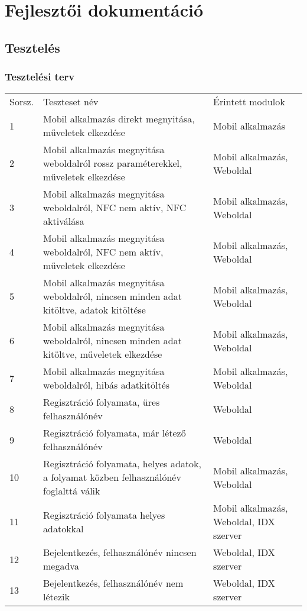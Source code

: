 \section{Fejlesztői dokumentáció}

\subsection{Tesztelés}
\subsubsection{Tesztelési terv}
\begin{tabular}{|p{1cm}|p{8cm} |p{4cm}|}
  \hline
\rowcolor{Title}
\multicolumn{3}{ |c| }{\color{white} Teszteset leírása} \\
  \hline
\rowcolor{Header}
Sorsz. & Teszteset név & Érintett modulok\tabularnewline
\hline 
  1 & Mobil alkalmazás direkt megnyitása, műveletek elkezdése & Mobil alkalmazás  \tabularnewline
  \hline
  2  & Mobil alkalmazás megnyitása weboldalról rossz paraméterekkel, műveletek elkezdése & Mobil alkalmazás, Weboldal  \tabularnewline
  \hline
 3  & Mobil alkalmazás megnyitása weboldalról, NFC nem aktív, NFC aktiválása & Mobil alkalmazás, Weboldal  \tabularnewline
  \hline
 4  & Mobil alkalmazás megnyitása weboldalról, NFC nem aktív, műveletek elkezdése & Mobil alkalmazás, Weboldal  \tabularnewline
  \hline
 5  & Mobil alkalmazás megnyitása weboldalról, nincsen minden adat kitöltve, adatok kitöltése & Mobil alkalmazás, Weboldal  \tabularnewline
  \hline
 6  & Mobil alkalmazás megnyitása weboldalról, nincsen minden adat kitöltve, műveletek elkezdése & Mobil alkalmazás, Weboldal  \tabularnewline
  \hline
 7  & Mobil alkalmazás megnyitása weboldalról, hibás adatkitöltés & Mobil alkalmazás, Weboldal  \tabularnewline
  \hline
 8  & Regisztráció folyamata, üres felhasználónév &  Weboldal  \tabularnewline
  \hline
 9  & Regisztráció folyamata, már létező felhasználónév &  Weboldal  \tabularnewline
  \hline
 10  & Regisztráció folyamata, helyes adatok, a folyamat közben felhasználónév foglalttá válik &   Mobil alkalmazás, Weboldal \tabularnewline
  \hline
 11  & Regisztráció folyamata helyes adatokkal & Mobil alkalmazás, Weboldal, IDX szerver  \tabularnewline
  \hline
 12  & Bejelentkezés, felhasználónév nincsen megadva & Weboldal, IDX szerver \tabularnewline
  \hline
 13  & Bejelentkezés, felhasználónév nem létezik & Weboldal, IDX szerver \tabularnewline
  \hline
\end{tabular}

